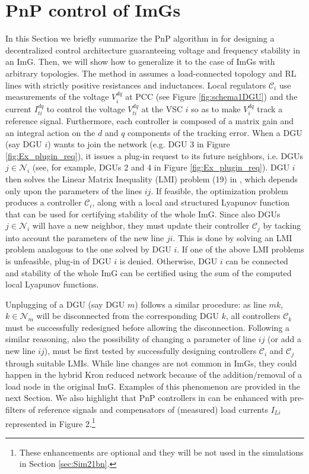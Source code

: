 \documentclass[a4paper]{article}
\theoremstyle{plain}
\newcommand{\CC}{{\mathcal C}}
\newcommand{\NN}{{\mathcal N}}
\begin{document}
\section{PnP control of ImGs}
\label{sec:PnPctrl}
In this Section we briefly summarize the PnP algorithm in \cite{riverso2015plug} for designing a decentralized control architecture guaranteeing voltage and frequency stability in an ImG. Then, we will show how to generalize it to the case of ImGs with arbitrary topologies. The method in \cite{riverso2015plug} assumes a load-connected topology and RL lines with strictly positive resistances and inductances. Local regulators $\CC_i$ use measurements of the voltage $V^{dq}_i$ at PCC (see Figure \ref{fig:schema1DGU}) and the current $I^{dq}_{ti}$ to control the voltage $V_{ti}^{dq}$ at the VSC $i$ so as to make $V_{i}^{dq}$ track a reference signal. Furthermore, each controller is composed of a matrix gain and an integral action on the $d$ and $q$ components of the tracking error.
When a DGU (say DGU $i$) wants to join the network (e.g. DGU 3 in Figure \ref{fig:Ex_plugin_req}), it issues a plug-in request to its future neighbors, i.e. DGUs $j\in\NN_i$ (see, for example, DGUs 2 and 4 in Figure \ref{fig:Ex_plugin_req}). DGU $i$ then solves the Linear Matrix Inequality (LMI) problem (19) in \cite{riverso2015plug}, which depends only upon the parameters of the lines $ij$. If feasible, the optimization problem produces a controller $\CC_i$, along with a local and structured Lyapunov function that can be used for certifying stability of the whole ImG. Since also DGUs $j\in\NN_i$ will have a new neighbor, they must update their controller $\CC_j$ by tacking into account the parameters of the new line $ji$. This is done by solving an LMI problem analogous to the one solved by DGU $i$. 
If one of the above LMI problems is unfeasible, plug-in of DGU $i$ is denied. Otherwise, 
DGU $i$ can be connected and stability of the whole ImG can be certified using the sum of the computed local Lyapunov functions. 

Unplugging of a DGU (say DGU $m$) follows a similar procedure: as line $mk$, $k\in\NN_m$ will be disconnected from the corresponding DGU $k$, all controllers $\CC_k$ must be successfully redesigned before allowing the disconnection. Following a similar reasoning, also the possibility of changing a parameter of line $ij$ (or add a new line $ij$), must be first tested by successfully designing controllers $\CC_i$ and $\CC_j$ through suitable LMIs. 
While line changes are not common in ImGs, they could happen in the hybrid Kron reduced network because of the addition/removal of a load node in the original ImG. Examples of this phenomenon are provided in the next Section. We also highlight that PnP controllers in \cite{riverso2015plug} can be enhanced with pre-filters of reference signals and compensators of (measured) load currents $I_{Li}$ represented in Figure 2.\footnote{These enhancements are optional and they will be not used in the simulations in Section \ref{sec:Sim21bn}.}
\end{document}
